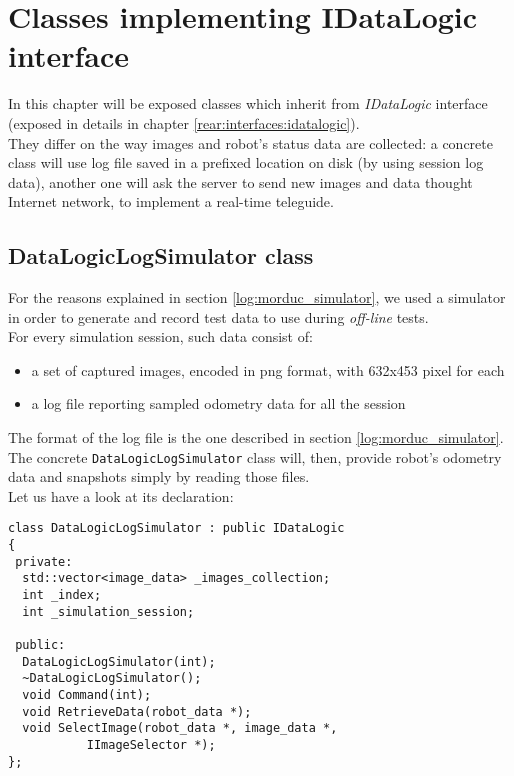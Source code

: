 \section{Classes implementing IDataLogic interface}
\label{concr:idatalogic}

In this chapter will be exposed classes which inherit
from \textit{IDataLogic} interface (exposed in details
in chapter \ref{rear:interfaces:idatalogic}).
\\
They differ on the way images
and robot's status data are collected: a concrete class
will use log file saved in a prefixed location on disk
(by using session log data),
another one will ask the server to send new images and data
thought Internet network, to implement a real-time teleguide.

\subsection{DataLogicLogSimulator class}
\label{concr:idatalogic:datalogiclogsimulator}

For the reasons explained in section \ref{log:morduc_simulator},
we used a \morduc{} simulator in order to generate and record 
test data to use during \textit{off-line} tests.
\\
For every simulation session, such data consist of:

\begin{itemize}
  \item a set of captured images, encoded in png format,
    with 632x453 pixel for each
  \item a log file reporting sampled odometry data
    for all the session
\end{itemize}

The format of the log file is the one described in section 
\ref{log:morduc_simulator}.
\\
The concrete \texttt{DataLogicLogSimulator} class will, then, provide 
robot's odometry data and snapshots simply by reading 
those files.
\\
Let us have a look at its declaration:
\\
\begin{lstlisting}[caption={\texttt{DataLogicLogSimulator} declaration},
    label={code:datalogiclogsimulator:declaration}]
class DataLogicLogSimulator : public IDataLogic
{
 private:
  std::vector<image_data> _images_collection;
  int _index;
  int _simulation_session;
  
 public:
  DataLogicLogSimulator(int);
  ~DataLogicLogSimulator();
  void Command(int);
  void RetrieveData(robot_data *);
  void SelectImage(robot_data *, image_data *,
		   IImageSelector *);
};
\end{lstlisting}

